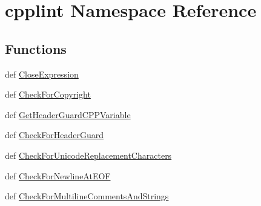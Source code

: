 \hypertarget{namespacecpplint}{
\section{cpplint Namespace Reference}
\label{namespacecpplint}
}
\subsection*{Functions}
\begin{DoxyCompactItemize}
\item 
def \hyperlink{namespacecpplint_a9713059a1f275ecb548f18733306791d}{CloseExpression}
\item 
def \hyperlink{namespacecpplint_ac9cdecc582bc833c2eb7ac6eed6d2624}{CheckForCopyright}
\item 
def \hyperlink{namespacecpplint_a8eedb7313093d59b41bd7c5b19c2ddaf}{GetHeaderGuardCPPVariable}
\item 
def \hyperlink{namespacecpplint_a6ecd551d11dde0a916ef4a6317b70585}{CheckForHeaderGuard}
\item 
def \hyperlink{namespacecpplint_a04dd8f7483533a2ec7df687c180e9d22}{CheckForUnicodeReplacementCharacters}
\item 
def \hyperlink{namespacecpplint_a84408591ac7ff7e427560a252360070b}{CheckForNewlineAtEOF}
\item 
def \hyperlink{namespacecpplint_ae319b3dce42ad005bcddfd3d4df9656d}{CheckForMultilineCommentsAndStrings}
\end{DoxyCompactItemize}
